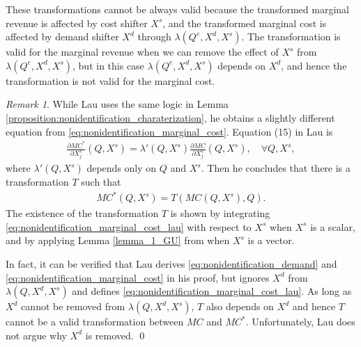 \documentclass[11pt, a4paper]{article}
\theoremstyle{remark}
\newtheorem{remark}{Remark}
\begin{document}
These transformations cannot be always valid because the transformed marginal revenue is affected by cost shifter $X^{s}$, and the transformed marginal cost is affected by demand shifter $X^{d}$ through $\lambda(Q^e, X^{d}, X^{s})$.
The transformation is valid for the marginal revenue when we can remove the effect of $X^{s}$ from $\lambda(Q^e, X^{d}, X^{s})$, but in this case $\lambda(Q^e, X^{d}, X^{s})$ depends on $X^{d}$, and hence the transformation is not valid for the marginal cost.

\begin{remark}\label{remark:lau_argument_transformation}
While Lau uses the same logic in Lemma \ref{proposition:nonidentification_charaterization}, he obtains a slightly different equation from \eqref{eq:nonidentification_marginal_cost}.
Equation (15) in Lau is
\begin{align}
    \frac{\partial MC^{*}}{\partial X^{s}_j}(Q, X^{s}) = \lambda'(Q, X^{s}) \frac{\partial MC}{\partial X^{s}_j}(Q, X^{s}),\quad \forall Q, X^{s}, \label{eq:nonidentification_marginal_cost_lau}
\end{align}
where $\lambda'(Q, X^{s})$ depends only on $Q$ and $X^{s}$.
Then he concludes that there is a transformation $T$ such that 
\begin{align}
    MC^{*}(Q, X^{s}) = T(MC(Q, X^{s}), Q). \label{eq:mc_transformation_lau}
\end{align}
The existence of the transformation $T$ is shown by integrating \eqref{eq:nonidentification_marginal_cost_lau} with respect to $X^{s}$ when $X^{s}$ is a scalar, and by applying Lemma \ref{lemma_1_GU} from \citet{goldmanNote1964} when $X^{s}$ is a vector.

In fact, it can be verified that Lau derives \eqref{eq:nonidentification_demand} and \eqref{eq:nonidentification_marginal_cost} in his proof, but ignores $X^{d}$ from $\lambda(Q, X^{d}, X^{s})$ and defines \eqref{eq:nonidentification_marginal_cost_lau}.
As long as $X^{d}$ cannot be removed from $\lambda(Q, X^{d}, X^{s})$, $T$ also depends on $X^{d}$ and hence $T$ cannot be a valid transformation between $MC$ and $MC^{*}$.
Unfortunately, Lau does not argue why $X^{d}$ is removed.
\qed
\end{remark}
\end{document}
